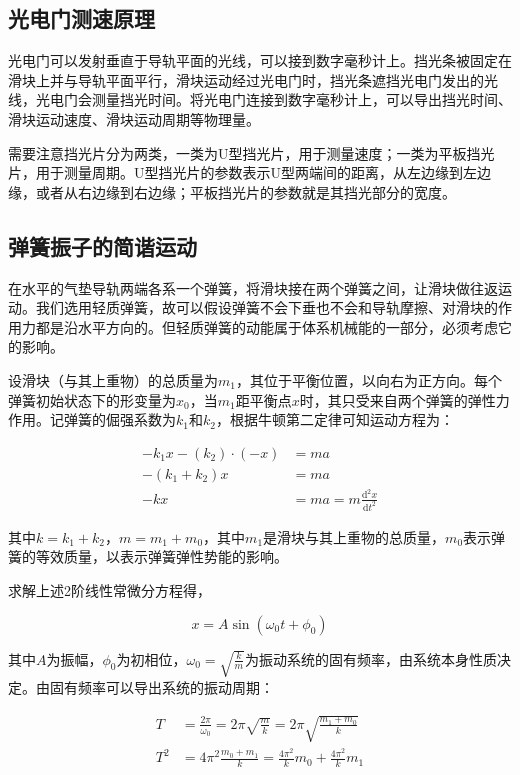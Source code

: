 \documentclass[12pt]{article}
\begin{document}
\subsection{光电门测速原理}
光电门可以发射垂直于导轨平面的光线，可以接到数字毫秒计上。挡光条被固定在滑块上并与导轨平面平行，滑块运动经过光电门时，挡光条遮挡光电门发出的光线，光电门会测量挡光时间。将光电门连接到数字毫秒计上，可以导出挡光时间、滑块运动速度、滑块运动周期等物理量。

需要注意挡光片分为两类，一类为U型挡光片，用于测量速度；一类为平板挡光片，用于测量周期。U型挡光片的参数表示U型两端间的距离，从左边缘到左边缘，或者从右边缘到右边缘；平板挡光片的参数就是其挡光部分的宽度。

\subsection{弹簧振子的简谐运动}
在水平的气垫导轨两端各系一个弹簧，将滑块接在两个弹簧之间，让滑块做往返运动。我们选用轻质弹簧，故可以假设弹簧不会下垂也不会和导轨摩擦、对滑块的作用力都是沿水平方向的。但轻质弹簧的动能属于体系机械能的一部分，必须考虑它的影响。

设滑块（与其上重物）的总质量为$ m_1 $，其位于平衡位置，以向右为正方向。每个弹簧初始状态下的形变量为$ x_0 $，当$ m_1 $距平衡点$ x $时，其只受来自两个弹簧的弹性力作用。记弹簧的倔强系数为$ k_1 $和$ k_2 $，根据牛顿第二定律可知运动方程为：

\[
    \begin{aligned}
        -k_1x-(k_2)\cdot(-x)&=ma \\
        -(k_1+k_2)x&=ma \\
        -kx&=ma=m\frac{\mathrm{d}^2x}{\mathrm{d}t^2}
    \end{aligned}  
\]

其中$k=k_1+k_2$，$m=m_1+m_0$，其中$m_1$是滑块与其上重物的总质量，$m_0$表示弹簧的等效质量，以表示弹簧弹性势能的影响。

求解上述2阶线性常微分方程得，

\[
    x=A\sin(\omega_0t+\phi_0)
\]

其中$A$为振幅，$\phi_0$为初相位，$\omega_0=\sqrt{\frac{k}{m}}$为振动系统的固有频率，由系统本身性质决定。由固有频率可以导出系统的振动周期：

\begin{equation}\label{eq:1}
    \begin{aligned}
        T&=\frac{2\pi}{\omega_0}=2\pi\sqrt{\frac{m}{k}}=2\pi\sqrt{\frac{m_1+m_0}{k}} \\
        T^2&=4\pi^2\frac{m_0+m_1}{k}=\frac{4\pi^2}{k}m_0+\frac{4\pi^2}{k}m_1
    \end{aligned}
\end{equation}
\end{document}
